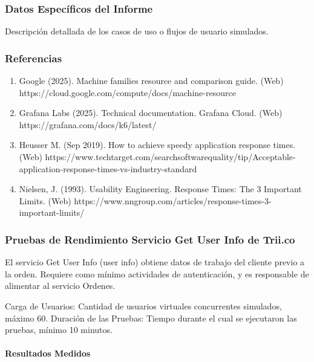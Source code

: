 \documentclass[
  paper=a4,
  ,captions=tableheading
]{scrartcl}
\providecommand{\tightlist}{%
  \setlength{\itemsep}{0pt}\setlength{\parskip}{0pt}}
\begin{document}
\subsubsection{Datos Específicos del
Informe}\label{sec:datos-especuxedficos-del-informe}

Descripción detallada de los casos de uso o flujos de usuario simulados.

\subsubsection{Referencias}\label{sec:referencias}

\begin{enumerate}
\def\labelenumi{\arabic{enumi}.}
\tightlist
\item
  Google (2025). Machine families resource and comparison guide. (Web)
  https://cloud.google.com/compute/docs/machine-resource
\item
  Grafana Labs (2025). Technical documentation. Grafana Cloud. (Web)
  https://grafana.com/docs/k6/latest/
\item
  Heusser M. (Sep 2019). How to achieve speedy application response
  times. (Web)
  https://www.techtarget.com/searchsoftwarequality/tip/Acceptable-application-response-times-vs-industry-standard
\item
  Nielsen, J. (1993). Usability Engineering. Response Times: The 3
  Important Limits. (Web)
  https://www.nngroup.com/articles/response-times-3-important-limits/
\end{enumerate}

\subsubsection{Pruebas de Rendimiento Servicio Get User Info de
Trii.co}\label{sec:pruebas-de-rendimiento-servicio-get-user-info-de-trii.co}

El servicio Get User Info (user info) obtiene datos de trabajo del
cliente previo a la orden. Requiere como mínimo actividades de
autenticación, y es responsable de alimentar al servicio Ordenes.

Carga de Usuarios: Cantidad de usuarios virtuales concurrentes
simulados, máximo 60. Duración de las Pruebas: Tiempo durante el cual se
ejecutaron las pruebas, mínimo 10 minutos.

\paragraph{Resultados Medidos}\label{sec:resultados-medidos}
\end{document}
